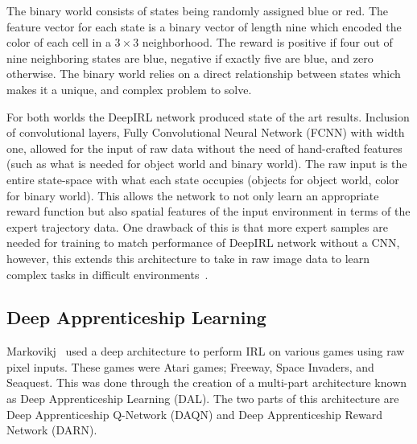 \documentclass[12pt,american]{report}
\begin{document}
The binary world consists of states being randomly assigned blue or red.  The feature vector for each state is a binary vector of length nine which encoded the color of each cell in a $3\times 3$ neighborhood. The reward is positive if four out of nine neighboring states are blue, negative if exactly five are blue, and zero otherwise.  The binary world relies on a direct relationship between states which makes it a unique, and complex problem to solve. 

For both worlds the DeepIRL network produced state of the art results. Inclusion of convolutional layers, Fully Convolutional Neural Network (FCNN) with width one, allowed for the input of raw data without the need of hand-crafted features (such as what is needed for object world and binary world). The raw input is the entire state-space with what each state occupies (objects for object world, color for binary world). This allows the network to not only learn an appropriate reward function but also spatial features of the input environment in terms of the expert trajectory data.  One drawback of this is that more expert samples are needed for training to match performance of DeepIRL network without a CNN, however, this extends this architecture to take in raw image data to learn complex tasks in difficult environments~\cite{wulfmeier2015maximum}.

\subsection{Deep Apprenticeship Learning}
\label{sec:DAL}
Markovikj~\cite{markovikj2014deep} used a deep architecture to perform IRL on various games using raw pixel inputs. These games were Atari games; Freeway, Space Invaders, and Seaquest. This was done through the creation of a multi-part architecture known as Deep Apprenticeship Learning (DAL). The two parts of this architecture are Deep Apprenticeship Q-Network (DAQN) and Deep Apprenticeship Reward Network (DARN).
\end{document}
